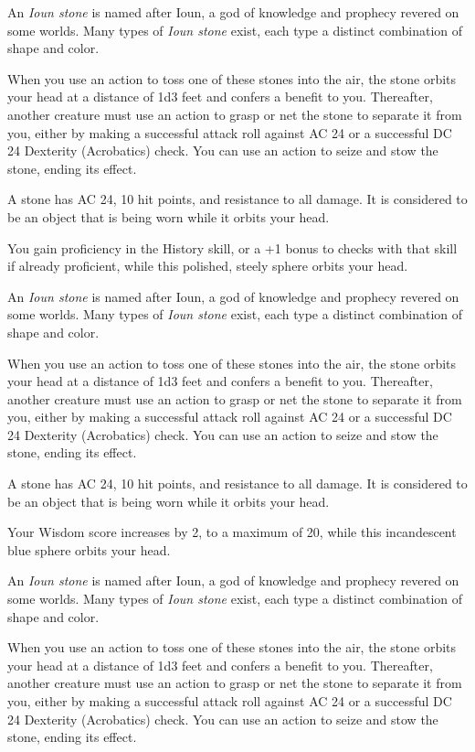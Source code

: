 \documentclass[10pt,a4paper,twoside,bg=print,twocolumn,openany,nodeprecatedcode]{dndbook}
\begin{document}
An \textit{Ioun stone} is named after Ioun, a god of knowledge and prophecy revered on some worlds. Many types of \textit{Ioun stone} exist, each type a distinct combination of shape and color.

When you use an action to toss one of these stones into the air, the stone orbits your head at a distance of 1d3 feet and confers a benefit to you. Thereafter, another creature must use an action to grasp or net the stone to separate it from you, either by making a successful attack roll against AC 24 or a successful DC 24 Dexterity (Acrobatics) check. You can use an action to seize and stow the stone, ending its effect.

A stone has AC 24, 10 hit points, and resistance to all damage. It is considered to be an object that is being worn while it orbits your head.

You gain proficiency in the History skill, or a +1 bonus to checks with that skill if already proficient, while this polished, steely sphere orbits your head.

An \textit{Ioun stone} is named after Ioun, a god of knowledge and prophecy revered on some worlds. Many types of \textit{Ioun stone} exist, each type a distinct combination of shape and color.

When you use an action to toss one of these stones into the air, the stone orbits your head at a distance of 1d3 feet and confers a benefit to you. Thereafter, another creature must use an action to grasp or net the stone to separate it from you, either by making a successful attack roll against AC 24 or a successful DC 24 Dexterity (Acrobatics) check. You can use an action to seize and stow the stone, ending its effect.

A stone has AC 24, 10 hit points, and resistance to all damage. It is considered to be an object that is being worn while it orbits your head.

Your Wisdom score increases by 2, to a maximum of 20, while this incandescent blue sphere orbits your head.

An \textit{Ioun stone} is named after Ioun, a god of knowledge and prophecy revered on some worlds. Many types of \textit{Ioun stone} exist, each type a distinct combination of shape and color.

When you use an action to toss one of these stones into the air, the stone orbits your head at a distance of 1d3 feet and confers a benefit to you. Thereafter, another creature must use an action to grasp or net the stone to separate it from you, either by making a successful attack roll against AC 24 or a successful DC 24 Dexterity (Acrobatics) check. You can use an action to seize and stow the stone, ending its effect.
\end{document}
